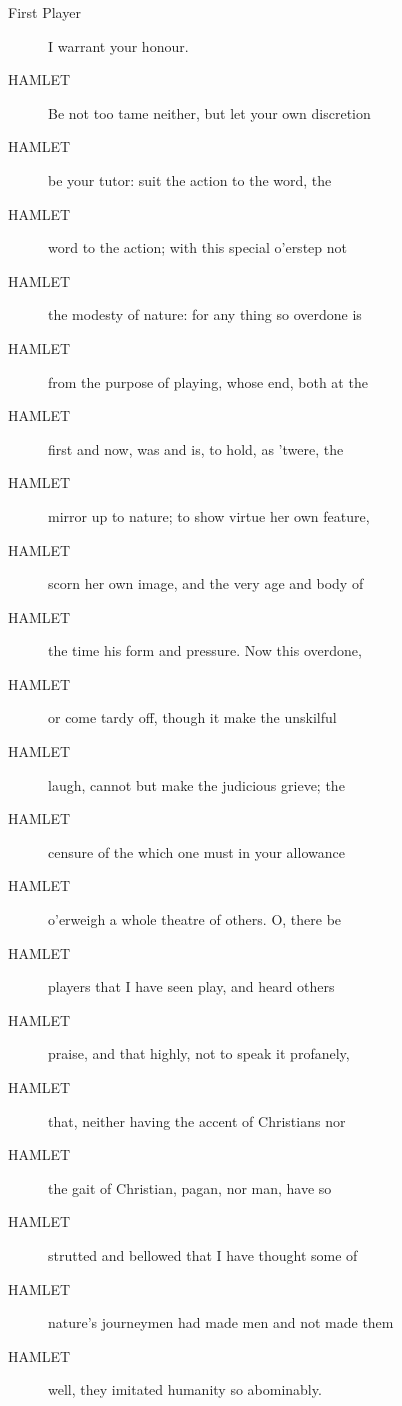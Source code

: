 \documentclass{article}
\begin{document}
\begin{description}
            
\item[First Player] I warrant your honour.
\end{description}
          
\begin{description}
            
\item[HAMLET] Be not too tame neither, but let your own discretion
\item[HAMLET] be your tutor: suit the action to the word, the
\item[HAMLET] word to the action; with this special o'erstep not
\item[HAMLET] the modesty of nature: for any thing so overdone is
\item[HAMLET] from the purpose of playing, whose end, both at the
\item[HAMLET] first and now, was and is, to hold, as 'twere, the
\item[HAMLET] mirror up to nature; to show virtue her own feature,
\item[HAMLET] scorn her own image, and the very age and body of
\item[HAMLET] the time his form and pressure. Now this overdone,
\item[HAMLET] or come tardy off, though it make the unskilful
\item[HAMLET] laugh, cannot but make the judicious grieve; the
\item[HAMLET] censure of the which one must in your allowance
\item[HAMLET] o'erweigh a whole theatre of others. O, there be
\item[HAMLET] players that I have seen play, and heard others
\item[HAMLET] praise, and that highly, not to speak it profanely,
\item[HAMLET] that, neither having the accent of Christians nor
\item[HAMLET] the gait of Christian, pagan, nor man, have so
\item[HAMLET] strutted and bellowed that I have thought some of
\item[HAMLET] nature's journeymen had made men and not made them
\item[HAMLET] well, they imitated humanity so abominably.
\end{description}
          
\end{document}
